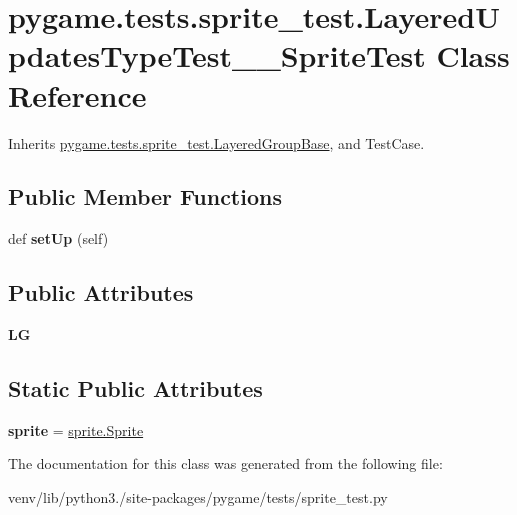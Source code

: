 \hypertarget{classpygame_1_1tests_1_1sprite__test_1_1_layered_updates_type_test_____sprite_test}{}\section{pygame.\+tests.\+sprite\+\_\+test.\+Layered\+Updates\+Type\+Test\+\_\+\+\_\+\+Sprite\+Test Class Reference}
\label{classpygame_1_1tests_1_1sprite__test_1_1_layered_updates_type_test_____sprite_test}


Inherits \hyperlink{classpygame_1_1tests_1_1sprite__test_1_1_layered_group_base}{pygame.\+tests.\+sprite\+\_\+test.\+Layered\+Group\+Base}, and Test\+Case.

\subsection*{Public Member Functions}
\begin{DoxyCompactItemize}
\item 
\mbox{\label{classpygame_1_1tests_1_1sprite__test_1_1_layered_updates_type_test_____sprite_test_a1b3d12e5268e5e97edebd173ac44548a}} 
def {\bfseries set\+Up} (self)
\end{DoxyCompactItemize}
\subsection*{Public Attributes}
\begin{DoxyCompactItemize}
\item 
\mbox{\label{classpygame_1_1tests_1_1sprite__test_1_1_layered_updates_type_test_____sprite_test_ab2063c3ce7352ff6b9ef442223324c8f}} 
{\bfseries LG}
\end{DoxyCompactItemize}
\subsection*{Static Public Attributes}
\begin{DoxyCompactItemize}
\item 
\mbox{\label{classpygame_1_1tests_1_1sprite__test_1_1_layered_updates_type_test_____sprite_test_ab72a8bcac6da8893438bce9a42521ab2}} 
{\bfseries sprite} = \hyperlink{classpygame_1_1sprite_1_1_sprite}{sprite.\+Sprite}
\end{DoxyCompactItemize}


The documentation for this class was generated from the following file\+:\begin{DoxyCompactItemize}
\item 
venv/lib/python3./site-\/packages/pygame/tests/sprite\+\_\+test.\+py\end{DoxyCompactItemize}
